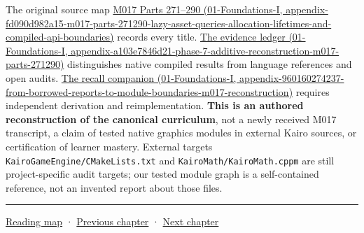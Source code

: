 The original source map \href{../01-Foundations-I/main.pdf\#nameddest=appendix-fd090d982a15-m017-parts-271290-lazy-asset-queries-allocation-lifetimes-and-compiled-api-boundaries}{M017 Parts 271--290 (01-Foundations-I, appendix-fd090d982a15-m017-parts-271290-lazy-asset-queries-allocation-lifetimes-and-compiled-api-boundaries)} records every title. \href{../01-Foundations-I/main.pdf\#nameddest=appendix-a103e7846d21-phase-7-additive-reconstruction-m017-parts-271290}{The evidence ledger (01-Foundations-I, appendix-a103e7846d21-phase-7-additive-reconstruction-m017-parts-271290)} distinguishes native compiled results from language references and open audits. \href{../01-Foundations-I/main.pdf\#nameddest=appendix-960160274237-from-borrowed-reports-to-module-boundaries-m017-reconstruction}{The recall companion (01-Foundations-I, appendix-960160274237-from-borrowed-reports-to-module-boundaries-m017-reconstruction)} requires independent derivation and reimplementation. \textbf{This is an authored reconstruction of the canonical curriculum}, not a newly received M017 transcript, a claim of tested native graphics modules in external Kairo sources, or certification of learner mastery. External targets \texttt{KairoGameEngine/CMakeLists.txt} and \texttt{KairoMath/KairoMath.cppm} are still project-specific audit targets; our tested module graph is a self-contained reference, not an invented report about those files.

\begin{center}\rule{0.5\linewidth}{0.5pt}\end{center}

\hyperref[volume-reading-map]{Reading map} · \hyperref[05-engine-i-ch005-generic-asset-pipelines-with-stable-identity]{Previous chapter} · \hyperref[05-engine-i-ch007-typed-apis-and-measured-cpu-data-structures]{Next chapter}
